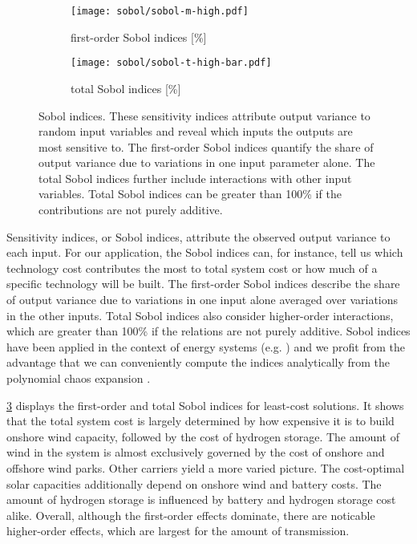 
\begin{figure}
    \begin{subfigure}[t]{0.45\textwidth}
        \caption{first-order Sobol indices [\%]}
        \label{fig:sobol:first}
        \texttt{[image: sobol/sobol-m-high.pdf]}
    \end{subfigure}
    \begin{subfigure}[t]{0.54\textwidth}
        \caption{total Sobol indices [\%]}
        \label{fig:sobol:total}
        \texttt{[image: sobol/sobol-t-high-bar.pdf]}
    \end{subfigure}
    \caption[First-order and total Sobol indices]{
      Sobol indices. These sensitivity indices attribute output variance to random input variables
      and reveal which inputs the outputs are most sensitive to. The first-order Sobol indices
      quantify the share of output variance due to variations in one input parameter alone.
      The total Sobol indices further include interactions with other input variables.
      Total Sobol indices can be greater than 100\% if the contributions are not purely additive.
    }
    \label{fig:sobol}
\end{figure}

Sensitivity indices, or Sobol indices, attribute the observed output variance to each input.
For our application, the Sobol indices can, for instance, tell us which technology cost
contributes the most to total system cost or how much of a specific technology will be built.
The first-order Sobol indices describe the share of output variance
due to variations in one input alone averaged over variations in the other inputs.
Total Sobol indices also consider higher-order interactions,
which are greater than 100\% if the relations are not purely additive.
Sobol indices have been applied in the context of energy systems (e.g. \cite{trondle_trade-offs_2020,mavromatidis_uncertainty_2018})
and we profit from the advantage that we can conveniently compute the indices analytically
from the polynomial chaos expansion \cite{sudret_global_2008}.

\cref{fig:sobol} displays the first-order and total Sobol indices for least-cost solutions.
It shows that the total system cost is largely determined by how expensive it is to build onshore wind capacity,
followed by the cost of hydrogen storage. The amount of wind in the system is 
almost exclusively governed by the cost of onshore and offshore wind parks.
Other carriers yield a more varied picture.
The cost-optimal solar capacities additionally depend on onshore wind and battery costs.
The amount of hydrogen storage is influenced by battery and hydrogen storage cost alike.
Overall, although the first-order effects dominate, there are noticable higher-order effects,
which are largest for the amount of transmission.

